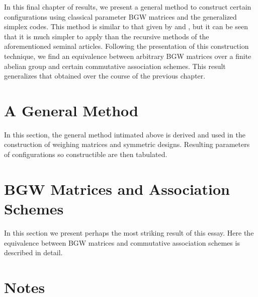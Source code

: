 \documentclass[../../main]{subfiles}
\begin{document}
 In this final chapter of results, we present a general method to construct certain configurations using classical parameter BGW matrices and the generalized simplex codes. This method is similar to that given by \cite{rajkundlia} and \cite{ionin-bgw-bibd}, but it can be seen that it is much simpler to apply than the recursive methods of the aforementioned seminal articles. Following the presentation of this construction technique, we find an equivalence between arbitrary BGW matrices over a finite abelian group and certain commutative association schemes. This result generalizes that obtained over the course of the previous chapter.

 \section{\centering A General Method}
 
 In this section, the general method intimated above is derived and used in the construction of weighing matrices and symmetric designs. Resulting parameters of configurations so constructible are then tabulated.
 
 \dinkus
 
 
 
 \section{\centering BGW Matrices and Association Schemes}
 
 In this section we present perhaps the most striking result of this essay. Here the equivalence between BGW matrices and commutative association schemes is described in detail.
 
 \dinkus
 
 
 
 \singlespace
 
 \section*{\centering Notes}
 \thefnotes
 
 \doublespacing
 
 \biblio
\end{document}
